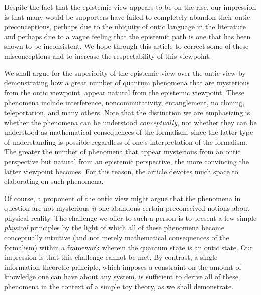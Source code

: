 \documentclass[pra,nofootinbib,showpacs,12pt]{revtex4}
\begin{document}
Despite the fact that the epistemic view appears to be on the rise, our
impression is that many would-be supporters have failed to completely
abandon their ontic preconceptions, perhaps due to the ubiquity of ontic
language in the literature and perhaps due to a vague feeling that the
epistemic path is one that has been shown to be inconsistent. We hope
through this article to correct some of these misconceptions and to increase
the respectability of this viewpoint.

We shall argue for the superiority of the epistemic view over the ontic view
by demonstrating how a great number of quantum phenomena that are mysterious
from the ontic viewpoint, appear natural from the epistemic viewpoint. These
phenomena include interference, noncommutativity, entanglement, no cloning,
teleportation, and many others. Note that the distinction we are emphasizing
is whether the phenomena can be understood \emph{conceptually}, not whether
they can be understood as mathematical consequences of the formalism, since
the latter type of understanding is possible regardless of one's
interpretation of the formalism. The greater the number of phenomena that
appear mysterious from an ontic perspective but natural from an epistemic
perspective, the more convincing the latter viewpoint becomes. For this
reason, the article devotes much space to elaborating on such phenomena.

Of course, a proponent of the ontic view might argue that the phenomena in
question are not mysterious \emph{if} one abandons certain preconceived
notions about physical reality. The challenge we offer to such a person is
to present a few simple \emph{physical} principles by the light of which all
of these phenomena become conceptually intuitive (and not merely
mathematical consequences of the formalism) within a framework wherein the
quantum state is an ontic state. Our impression is that this challenge
cannot be met. By contrast, a single information-theoretic principle, which
imposes a constraint on the amount of knowledge one can have about any
system, is sufficient to derive all of these phenomena in the context of a
simple toy theory, as we shall demonstrate.
\end{document}

